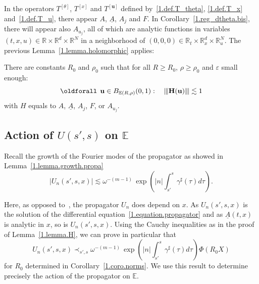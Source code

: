 \documentclass[AHL,Unicode,longabstracts,published]{cedram}
\theoremstyle{plain}
\newcommand*\e{\varepsilon}
\newcommand*\R{{\mathbb R}}
\newcommand*\EE{{\mathbb E}}
\newcommand*\g{\gamma}
\newcommand{\ubf}{{\mathbf u}}
\newcommand{\Hbf}{{\mathbf H}}
\newcommand*\und{\underline}
\DeclarePairedDelimiter{\VERT}{|\mkern -1.6mu|\mkern -1.6mu|}{|\mkern -1.6mu|\mkern -1.6mu|}
\renewcommand*{\forall}{\mathrel{\oldforall}}
\begin{document}
In the operators $T^{[\theta]}$, $T^{[x]} $ and $T^{[\ubf]} $ defined by~\eqref{1.def.T_theta}, \eqref{1.def.T_x} and~\eqref{1.def.T_u}, there appear $A$, $\und{A}$, $A_{j}$ and $F$. In Corollary~\ref{1.reg_dtheta.bis}, there will appear also $A_{u_j}$, all of which are analytic functions in variables $(t,x,u)\in\R\times\R^{d}\times\R^{N}$ in a neighborhood of $(0,0,0) \in \R_{t}\times\R_{x}^{d}\times\R_{u}^{N}$. The previous Lemma~\ref{1.lemma.holomorphic} applies:

\begin{coro}\label{1.coro.norms}
There are constants $R_0$ and $\rho_0$ such that for all $R\geq R_0$, $\rho \geq \rho_0$ and $\e$ small enough:
\begin{equation}\label{1.action.A}
\forall \,\ubf\in B_{\EE(R,\rho)}(0,1): \quad \VERT{\Hbf(\ubf)} \lesssim 1
\end{equation}
with $H$ equals to $A$, $\und{A}$, $A_j$, $F$, or $A_{u_j}$.
\end{coro}



\subsection{Action of \texorpdfstring{$U(s',s)$}{U(s',s)} on \texorpdfstring{$\EE$}{EE}}

Recall the growth of the Fourier modes of the propagator as showed in Lemma~\ref{1.lemma.growth.propa}
\[
|U_n(s',s,x)| \lesssim \omega^{-(m-1)}\,\exp\left(|n| \int_{s'}^{s} \g^{\sharp}(\tau) d\tau \right).
\]

Here, as opposed to~\cite{metivier2005remarks}, the propagator $U_n$ does depend on $x$. As $U_n(s',s,x)$ is the solution of the differential equation~\eqref{1.equation.propagator} and as $\und{A}(t,x)$ is analytic in $x$, so is $U_n(s',s,x)$. Using the Cauchy inequalities as in the proof of Lemma~\ref{1.lemma.H}, we can prove in particular that
\begin{equation}\label{1.esti.prec.propa}
U_n(s',s,x) \prec_{s',s} \omega^{-(m-1)}\,\exp\left(|n| \int_{s'}^{s} \g^{\sharp}(\tau) d\tau \right) \Phi(R_0 X)
\end{equation}
for $R_0$ determined in Corollary~\ref{1.coro.norms}. We use this result to determine precisely the action of the propagator on $\EE$.
\end{document}
